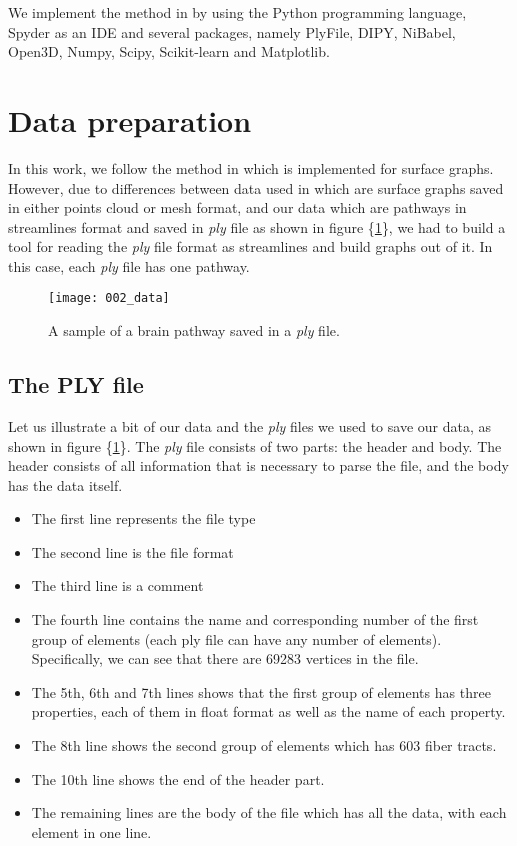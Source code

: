 \documentclass[../structure.tex]{subfiles}
\begin{document}
We implement the method in \cite{Amberg2007} by using the Python programming language, Spyder as an IDE and several packages, namely PlyFile, DIPY, NiBabel, Open3D, Numpy, Scipy, Scikit-learn and Matplotlib.

\section{Data preparation}
\hspace{2em}In this work, we follow the method in \cite{Amberg2007} which is implemented for surface graphs. However, due to differences between data used in \cite{Amberg2007} which are surface graphs saved in either points cloud or mesh format, and our data which are pathways in streamlines format and saved in \textit{ply} file as shown in figure \{\ref{fig:data}\}, we had to build a tool for reading the \textit{ply} file format as streamlines and build graphs out of it. In this case, each \textit{ply} file has one pathway.

\begin{figure}[h!]
\centering
\texttt{[image: 002\_data]}
\captionsetup{justification=centering}
\caption{A sample of a brain pathway saved in a \textit{ply} file.}
\label{fig:data}
\end{figure}

\subsection{The PLY file}
\hspace{2em}Let us illustrate a bit of our data and the \textit{ply} files we used to save our data, as shown in figure \{\ref{fig:data}\}. The \textit{ply} file consists of two parts: the header and body. The header consists of all information that is necessary to parse the file, and the body has the data itself.
\begin{itemize}
\item The first line represents the file type
\item The second line is the file format
\item The third line is a comment
\item The fourth line contains the name and corresponding number of the first group of elements (each ply file can have any number of elements). Specifically, we can see that there are 69283 vertices in the file.
\item The 5th, 6th and 7th lines shows that the first group of elements has three properties, each of them in float format as well as  the name of each property.
\item The 8th line shows the second group of elements which has 603 fiber tracts.
\item The 10th line shows the end of the header part.
\item The remaining lines are the body of the file which has all the data, with each element in one line.
\end{itemize}
\end{document}
